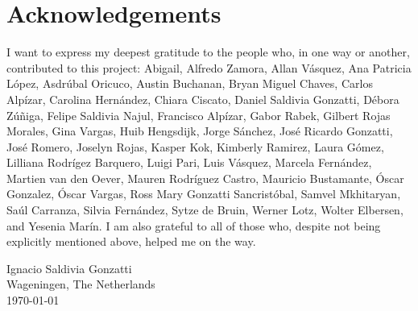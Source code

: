 \chapter*{Acknowledgements}
\noindent

I want to express my deepest gratitude to the people who, in one way or another, contributed to this project: Abigail, Alfredo Zamora, Allan Vásquez, Ana Patricia López, Asdrúbal Oricuco, Austin Buchanan, Bryan Miguel Chaves, Carlos Alpízar, Carolina Hernández, Chiara Ciscato, Daniel Saldivia Gonzatti, Débora Zúñiga, Felipe Saldivia Najul, Francisco Alpízar, Gabor Rabek, Gilbert Rojas Morales, Gina Vargas, Huib Hengsdijk, Jorge Sánchez, José Ricardo Gonzatti, José Romero, Joselyn Rojas, Kasper Kok, Kimberly Ramirez, Laura Gómez, Lilliana Rodrígez Barquero, Luigi Pari, Luis Vásquez, Marcela Fernández, Martien van den Oever, Mauren Rodríguez Castro, Mauricio Bustamante, Óscar Gonzalez, Óscar Vargas, Ross Mary Gonzatti Sancristóbal, Samvel Mkhitaryan, Saúl Carranza, Silvia Fernández, Sytze de Bruin, Werner Lotz, Wolter Elbersen, and Yesenia Marín. I am also grateful to all of those who, despite not being explicitly mentioned above, helped me on the way. 


\vspace{2em}
\noindent
Ignacio Saldivia Gonzatti \\
Wageningen, The Netherlands \\
\today